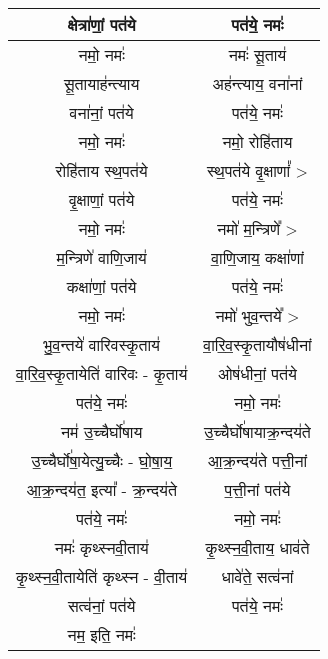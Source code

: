 {\begin{longtable}{|c|c|}
\hline
क्षेत्रा॑णां॒ पत॑ये              & पत॑ये॒ नमः॑\\
\hline
नमो॒ नमः॑                  & नमः॑ सू॒ताय॑\\
\hline
सू॒तायाह॑न्त्याय              & अह॑न्त्याय॒ वना॑नां\\
\hline
वना॑नां॒ पत॑ये                & पत॑ये॒ नमः॑\\
\hline
नमो॒ नमः॑                  & नमो॒ रोहि॑ताय\\
\hline
रोहि॑ताय स्थ॒पत॑ये            & स्थ॒पत॑ये वृ॒क्षाणां᳚ >\\
\hline
वृ॒क्षाणां॒ पत॑ये               & पत॑ये॒ नमः॑\\
\hline
नमो॒ नमः॑                  & नमो॑ म॒न्त्रिणे᳚ >\\
\hline
म॒न्त्रिणे॑ वाणि॒जाय॑           & वा॒णि॒जाय॒ कक्षा॑णां\\
\hline
कक्षा॑णां॒ पत॑ये               & पत॑ये॒ नमः॑\\
\hline
नमो॒ नमः॑                  & नमो॑ भुव॒न्तये᳚ >\\
\hline
भु॒व॒न्तये॑ वारिवस्कृ॒ताय॑         & वा॒रि॒व॒स्कृ॒तायौष॑धीनां\\
\hline
वा॒रि॒व॒स्कृ॒तायेति॑ वारिवः - कृ॒ताय॑ & ओष॑धीनां॒ पत॑ये\\
\hline
पत॑ये॒ नमः॑                  & नमो॒ नमः॑\\
\hline
नम॑ उ॒च्चैर्घो॑षाय             & उ॒च्चैर्घो॑षायाक्र॒न्दय॑ते\\
\hline
उ॒च्चैर्घो॑षा॒येत्यु॒च्चैः - घो॒षा॒य॒   & आ॒क्र॒न्दय॑ते पत्ती॒नां\\
\hline
आ॒क्र॒न्दय॑त॒ इत्या᳚ - क्र॒न्दय॑ते    & प॒त्ती॒नां पत॑ये\\
\hline
पत॑ये॒ नमः॑                  & नमो॒ नमः॑\\
\hline
नमः॑ कृथ्स्नवी॒ताय॑            & कृ॒थ्स्न॒वी॒ताय॒ धाव॑ते\\
\hline
कृ॒थ्स्न॒वी॒तायेति॑ कृथ्स्न - वी॒ताय॑ & धावे॑ते॒ सत्व॑नां\\
\hline
सत्व॑नां॒ पत॑ये                & पत॑ये॒ नमः॑\\
\hline
नम॒ इति॒ नमः॑               & \\
\hline
\end{longtable}
}
